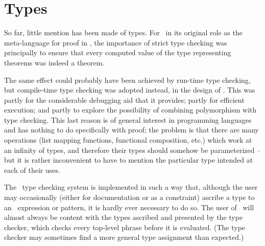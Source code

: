 \documentclass[11pt]{article}
\begin{document}



\section{{\ML} Types}
\label{sec:ML-types}


So far, little mention has been made of types.  For \ML\ in its original role as
the meta-language for proof in \LCF, the importance of strict type
checking was
principally to ensure that every computed value of the type representing
theorems was indeed a theorem.

The same effect could probably have been achieved by run-time type checking, but
compile-time type checking was adopted instead, in the design of \ML.  This was
partly for the considerable debugging aid that it provides; partly for efficient
execution; and partly to explore the possibility of combining polymorphism with
type checking.  This last reason is of general interest in programming languages
and has nothing to do specifically with proof; the problem is that there are
many operations (list mapping functions, functional composition, etc.) which
work at an infinity of types, and therefore their types should somehow be
parameterized -- but it is rather inconvenient to have to mention the particular
type intended at each of their uses.

The \ML\ type checking system is implemented in such a way that, although the
user may occasionally (either for documentation or as a constraint) ascribe a
type to an \ML\ expression or pattern, it is hardly ever necessary to do so.
The user of \ML\ will almost always be content with the types ascribed and
presented by the type checker, which checks every top-level phrase before it is
evaluated.  (The type checker may sometimes find a more general type assignment
than expected.)
\end{document}
